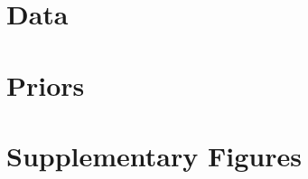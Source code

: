 \documentclass[a4paper, oneside]{discothesis}
\begin{document}
\tableofcontents

\mainmatter %





















\appendix
\chapter{Data}
\chapter{Priors}
\chapter{Supplementary Figures}
\end{document}
